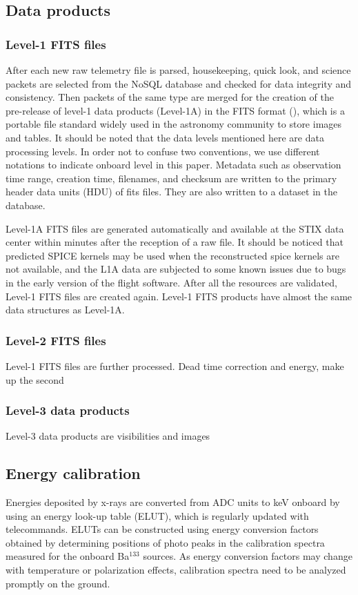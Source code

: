 \documentclass[referee]{aa} %
\begin{document}
\subsection{Data products}
\subsubsection{Level-1 FITS files}
After each new raw telemetry file is parsed, housekeeping, quick look, and science packets  
are selected from the NoSQL database 
and checked for data integrity and consistency. 
Then packets of the same type are merged for the creation of the pre-release of 
level-1 data products (Level-1A) 
 in the FITS format (\cite{fits}), 
which is a portable file standard widely used in the astronomy 
community to store images and tables.
It should be noted that the data levels mentioned here are data processing levels. 
In order not to confuse two conventions, we use different notations to indicate onboard level in this paper. 
Metadata such as observation time range, creation time, filenames, and checksum are written to 
the primary header data units (HDU) of fits files. 
They are also written to a dataset in the database.

Level-1A FITS files are generated automatically and available at the STIX data center within minutes 
after the reception of a raw file.
It should be noticed that predicted SPICE kernels may be used when the reconstructed spice kernels  
are not available, and the L1A data are subjected to some known issues 
due to bugs in the early version of the flight software.
After all the resources are validated,  Level-1  FITS files are created again. 
Level-1  FITS products have almost the same data structures as Level-1A.
\subsubsection{Level-2 FITS files}
Level-1 FITS files are further processed. 
Dead time  correction and energy, make up the second
\subsubsection{Level-3 data products}
Level-3 data products are visibilities and images

\subsection{Energy calibration}
Energies deposited by x-rays are converted from ADC units 
to keV onboard by using an energy look-up table (ELUT),
 which is regularly updated with telecommands.
ELUTs can be constructed using energy conversion factors obtained by determining 
positions of photo peaks in the calibration spectra measured for the onboard Ba$^{133}$ sources.  
As energy conversion factors may change with temperature 
or polarization effects,  calibration spectra need to be analyzed promptly on the ground. 
\end{document}
